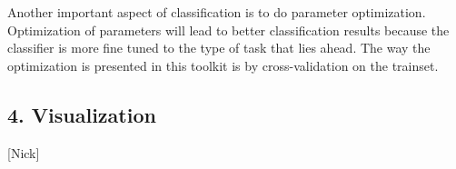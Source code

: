Another important aspect of classification is to do parameter optimization. 
Optimization of parameters will lead to better classification results because the classifier is more fine tuned to the type of task that lies ahead. 
The way the optimization is presented in this toolkit is by cross-validation on the trainset.

\subsection{4. Visualization}
[Nick]
